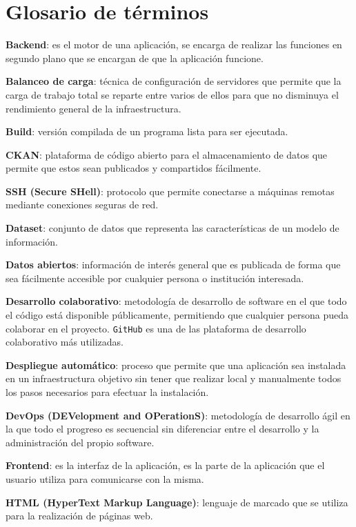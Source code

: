 \chapter{Glosario de términos}

\textbf{Backend}: es el motor de una aplicación, se encarga de realizar las funciones en segundo plano que se encargan de que la aplicación funcione.
\bigskip

\textbf{Balanceo de carga}: técnica de configuración de servidores que permite que la carga de trabajo total se reparte entre varios de ellos para que no disminuya el rendimiento general de la infraestructura.
\bigskip

\textbf{Build}: versión compilada de un programa lista para ser ejecutada.
\bigskip

\textbf{CKAN}: plataforma de código abierto para el almacenamiento de datos que permite que estos sean publicados y compartidos fácilmente.
\bigskip

\textbf{SSH (Secure SHell)}: protocolo que permite conectarse a máquinas remotas mediante conexiones seguras de red.
\bigskip

\textbf{Dataset}: conjunto de datos que representa las características de un modelo de información.
\bigskip

\textbf{Datos abiertos}: información de interés general que es publicada de forma que sea fácilmente accesible por cualquier persona o institución interesada.
\bigskip

\textbf{Desarrollo colaborativo}: metodología de desarrollo de software en el que todo el código está disponible públicamente, permitiendo que cualquier persona pueda colaborar en el proyecto. {\tt GitHub} es una de las plataforma de desarrollo colaborativo más utilizadas.
\bigskip

\textbf{Despliegue automático}: proceso que permite que una aplicación sea instalada en un infraestructura objetivo sin tener que realizar local y manualmente todos los pasos necesarios para efectuar la instalación.
\bigskip

\textbf{DevOps (DEVelopment and OPerationS)}: metodología de desarrollo ágil en la que todo el progreso es secuencial sin diferenciar entre el desarrollo y la administración del propio software.
\bigskip

\textbf{Frontend}: es la interfaz de la aplicación, es la parte de la aplicación que el usuario utiliza para comunicarse con la misma.
\bigskip

\textbf{HTML (HyperText Markup Language)}: lenguaje de marcado que se utiliza para la realización de páginas web.
\bigskip

